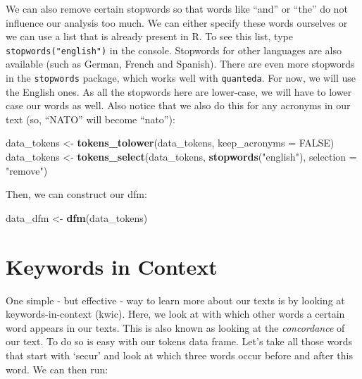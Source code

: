 \documentclass[
]{book}
\newenvironment{Shaded}{\begin{snugshade}}{\end{snugshade}}
\newcommand{\AttributeTok}[1]{\textcolor[rgb]{0.13,0.29,0.53}{#1}}
\newcommand{\ConstantTok}[1]{\textcolor[rgb]{0.56,0.35,0.01}{#1}}
\newcommand{\FunctionTok}[1]{\textcolor[rgb]{0.13,0.29,0.53}{\textbf{#1}}}
\newcommand{\NormalTok}[1]{#1}
\newcommand{\OtherTok}[1]{\textcolor[rgb]{0.56,0.35,0.01}{#1}}
\newcommand{\StringTok}[1]{\textcolor[rgb]{0.31,0.60,0.02}{#1}}
\begin{document}
We can also remove certain stopwords so that words like ``and'' or ``the'' do not influence our analysis too much. We can either specify these words ourselves or we can use a list that is already present in R. To see this list, type \texttt{stopwords("english")} in the console. Stopwords for other languages are also available (such as German, French and Spanish). There are even more stopwords in the \texttt{stopwords} package, which works well with \texttt{quanteda}. For now, we will use the English ones. As all the stopwords here are lower-case, we will have to lower case our words as well. Also notice that we also do this for any acronyms in our text (so, ``NATO'' will become ``nato''):

\begin{Shaded}
\begin{Highlighting}[]
\NormalTok{data\_tokens }\OtherTok{\textless{}{-}} \FunctionTok{tokens\_tolower}\NormalTok{(data\_tokens,}
                              \AttributeTok{keep\_acronyms =} \ConstantTok{FALSE}\NormalTok{)}
\NormalTok{data\_tokens }\OtherTok{\textless{}{-}} \FunctionTok{tokens\_select}\NormalTok{(data\_tokens,}
                             \FunctionTok{stopwords}\NormalTok{(}\StringTok{"english"}\NormalTok{),}
                             \AttributeTok{selection =} \StringTok{"remove"}\NormalTok{)}
\end{Highlighting}
\end{Shaded}

Then, we can construct our dfm:

\begin{Shaded}
\begin{Highlighting}[]
\NormalTok{data\_dfm }\OtherTok{\textless{}{-}} \FunctionTok{dfm}\NormalTok{(data\_tokens)}
\end{Highlighting}
\end{Shaded}

\section{Keywords in Context}\label{keywords-in-context}

One simple - but effective - way to learn more about our texts is by looking at keywords-in-context (kwic). Here, we look at with which other words a certain word appears in our texts. This is also known as looking at the \emph{concordance} of our text. To do so is easy with our tokens data frame. Let's take all those words that start with `secur' and look at which three words occur before and after this word. We can then run:
\end{document}
